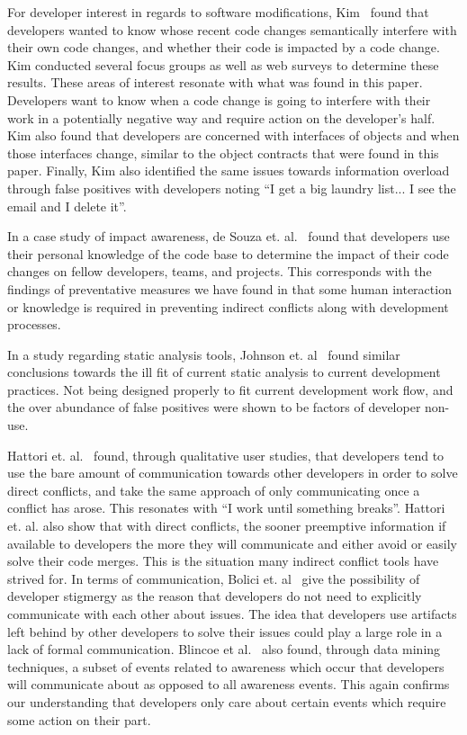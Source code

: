 \documentclass[conference]{IEEEtran}
\begin{document}
For developer interest in regards to software modifications, Kim~\cite{Kim:2011:ESA} found that developers wanted to know whose 
recent code changes semantically interfere with their own code changes, and whether their code is impacted by a code change.
Kim conducted several focus groups as well as web surveys to determine these results. These areas of interest resonate with what was
found in this paper. Developers want to know when a code change is going to interfere with their work in a potentially negative way and
require action on the developer's half.  Kim
also found that developers are concerned with interfaces of objects and when those interfaces change, similar to the object contracts that
were found in this paper. Finally, Kim also identified the same issues towards information overload through false positives with developers
noting ``I get a big laundry list... I see the email and I delete it''.

In a case study of impact awareness, de Souza et. al.~\cite{deSouza:2008:ESS} found that developers use their personal knowledge of the
code base to determine the impact of their code changes on fellow developers, teams, and projects. This corresponds with the findings of
preventative measures we have found in that some human interaction or knowledge is required in preventing indirect conflicts along with
development processes.

In a study regarding static analysis tools, Johnson et. al~\cite{Johnson:2013:WDS} found similar conclusions towards the
ill fit of current static analysis to current development practices. Not being designed properly to fit current development work
flow, and the over abundance of false positives were shown to be factors of developer non-use. 

Hattori et. al.~\cite{Hattori:2012:ICG} found, through qualitative user studies, that developers tend to use the bare amount of communication
towards other developers in order to solve direct conflicts, and take the same approach of only communicating once a conflict has arose. This
resonates with ``I work until something breaks''. Hattori et. al. also show that with direct conflicts, the
sooner preemptive information if available to developers the more they will communicate and either avoid or easily solve their code merges.
This is the situation many indirect conflict tools have strived for. In terms of communication, Bolici et. al~\cite{Bolici:2009} give the 
possibility of developer stigmergy as the reason that developers do not need to explicitly communicate with each other about issues. The idea
that developers use artifacts left behind by other developers to solve their issues could play a large role in a lack of formal communication.
Blincoe et al.~\cite{Blincoe:2013:UCC} also found, through data mining techniques, a subset of events related to awareness 
which occur that developers will communicate about as opposed to all awareness events. This again confirms our understanding that developers
only care about certain events which require some action on their part.
\end{document}
